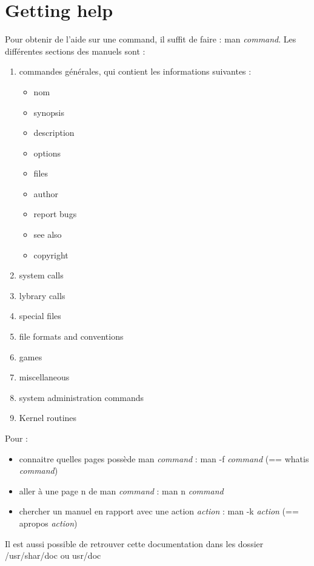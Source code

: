 \documentclass{article}
\begin{document}
\section{Getting help}
Pour obtenir de l'aide sur une command, il suffit de faire : man \textit{command}. Les différentes sections des manuels sont :
\begin{enumerate}
    \item commandes générales, qui contient les informations suivantes :
        \begin{itemize}
            \item nom
            \item synopsis
            \item description
            \item options
            \item files
            \item author
            \item report bugs
            \item see also
            \item copyright
        \end{itemize}
    \item system calls
    \item lybrary calls
    \item special files
    \item file formats and conventions
    \item games
    \item miscellaneous
    \item system administration commands
    \item Kernel routines
\end{enumerate}

\noindent Pour :
\begin{itemize}
    \item connaitre quelles pages possède man \textit{command} : man -f \textit{command} (== whatis \textit{command})
    \item aller à une page n de man \textit{command} : man n \textit{command}
    \item chercher un manuel en rapport avec une action \textit{action} : man -k \textit{action} (== apropos \textit{action})
\end{itemize}

\noindent Il est aussi possible de retrouver cette documentation dans les dossier /usr/shar/doc ou usr/doc

\newpage
\end{document}
